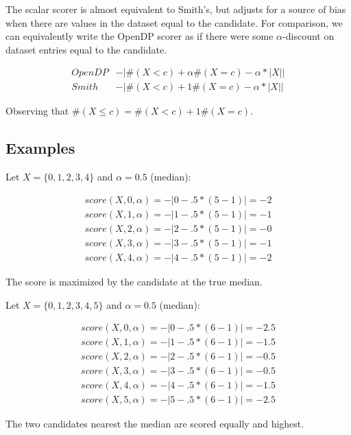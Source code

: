 \documentclass{article}
\begin{document}
The scalar scorer is almost equivalent to Smith's\cite{Smith11}, but adjusts for a source of bias when there are values in the dataset equal to the candidate.
For comparison, we can equivalently write the OpenDP scorer as if there were some $\alpha$-discount on dataset entries equal to the candidate.

\[
\begin{array}{cl}
    OpenDP &-|\#(X < c) + \alpha \#(X = c) - \alpha * |X|| \\
    Smith &-|\#(X < c) + 1 \#(X = c) - \alpha * |X||
\end{array}
\]

Observing that $\#(X \leq c) = \#(X < c) + 1 \#(X = c)$.


\subsection{Examples}

Let $X = \{0,1,2,3,4\}$ and $\alpha = 0.5$ (median):

\begin{align*}
    score(X, 0, \alpha) = -|0 - .5 * (5 - 1)| = -2 \\
    score(X, 1, \alpha) = -|1 - .5 * (5 - 1)| = -1 \\
    score(X, 2, \alpha) = -|2 - .5 * (5 - 1)| = -0 \\
    score(X, 3, \alpha) = -|3 - .5 * (5 - 1)| = -1 \\
    score(X, 4, \alpha) = -|4 - .5 * (5 - 1)| = -2
\end{align*}

The score is maximized by the candidate at the true median.

Let $X = \{0,1,2,3,4,5\}$ and $\alpha = 0.5$ (median):

\begin{align*}
    score(X, 0, \alpha) = -|0 - .5 * (6 - 1)| = -2.5 \\
    score(X, 1, \alpha) = -|1 - .5 * (6 - 1)| = -1.5 \\
    score(X, 2, \alpha) = -|2 - .5 * (6 - 1)| = -0.5 \\
    score(X, 3, \alpha) = -|3 - .5 * (6 - 1)| = -0.5 \\
    score(X, 4, \alpha) = -|4 - .5 * (6 - 1)| = -1.5 \\
    score(X, 5, \alpha) = -|5 - .5 * (6 - 1)| = -2.5
\end{align*}

The two candidates nearest the median are scored equally and highest.
\end{document}
